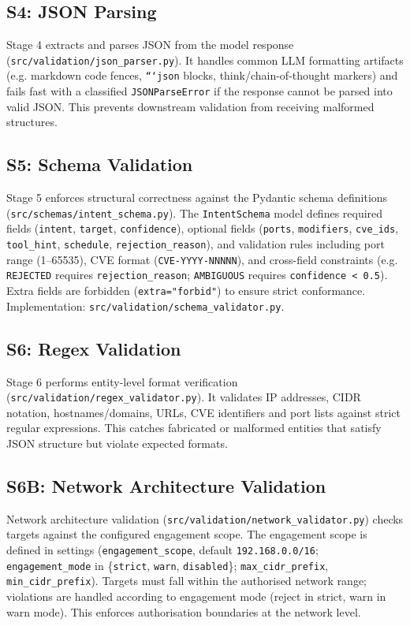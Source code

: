 \subsection{S4: JSON Parsing}

Stage 4 extracts and parses JSON from the model response (\texttt{src/validation/json\_parser.py}). It handles common LLM formatting artifacts (e.g. markdown code fences, \texttt{```json} blocks, think/chain-of-thought markers) and fails fast with a classified \texttt{JSONParseError} if the response cannot be parsed into valid JSON. This prevents downstream validation from receiving malformed structures.

\subsection{S5: Schema Validation}

Stage 5 enforces structural correctness against the Pydantic schema definitions (\texttt{src/schemas/intent\_schema.py}). The \texttt{IntentSchema} model defines required fields (\texttt{intent}, \texttt{target}, \texttt{confidence}), optional fields (\texttt{ports}, \texttt{modifiers}, \texttt{cve\_ids}, \texttt{tool\_hint}, \texttt{schedule}, \texttt{rejection\_reason}), and validation rules including port range (1--65535), CVE format (\texttt{CVE-YYYY-NNNNN}), and cross-field constraints (e.g. \texttt{REJECTED} requires \texttt{rejection\_reason}; \texttt{AMBIGUOUS} requires \texttt{confidence < 0.5}). Extra fields are forbidden (\texttt{extra="forbid"}) to ensure strict conformance. Implementation: \texttt{src/validation/schema\_validator.py}.

\subsection{S6: Regex Validation}

Stage 6 performs entity-level format verification (\texttt{src/validation/regex\_validator.py}). It validates IP addresses, CIDR notation, hostnames/domains, URLs, CVE identifiers and port lists against strict regular expressions. This catches fabricated or malformed entities that satisfy JSON structure but violate expected formats.

\subsection{S6B: Network Architecture Validation}

Network architecture validation (\texttt{src/validation/network\_validator.py}) checks targets against the configured engagement scope. The engagement scope is defined in settings (\texttt{engagement\_scope}, default \texttt{192.168.0.0/16}; \texttt{engagement\_mode} in \{\texttt{strict}, \texttt{warn}, \texttt{disabled}\}; \texttt{max\_cidr\_prefix}, \texttt{min\_cidr\_prefix}). Targets must fall within the authorised network range; violations are handled according to engagement mode (reject in strict, warn in warn mode). This enforces authorisation boundaries at the network level.

